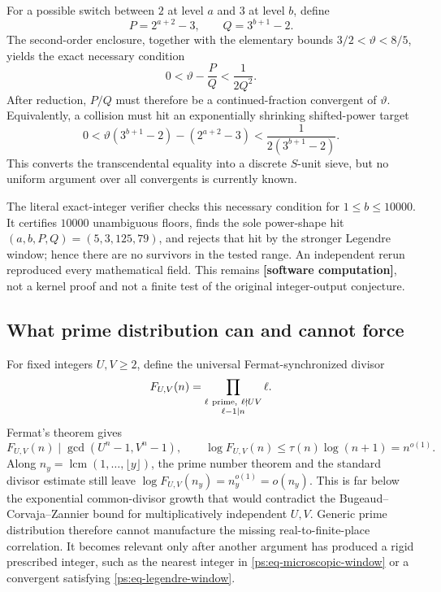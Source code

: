 \documentclass[11pt,oneside]{article}
\theoremstyle{definition}
\theoremstyle{remark}
\newcommand{\thetaq}{\vartheta}
\newcommand{\statuscomp}{\textcolor{computeviolet}{\textbf{[software computation]}}}
\begin{document}
For a possible switch between $2$ at level $a$ and $3$ at level $b$, define
\begin{equation}
 P=2^{a+2}-3,
 \qquad Q=3^{b+1}-2.
 \label{ps:eq-PQ}
\end{equation}
The second-order enclosure, together with the elementary bounds
$3/2<\thetaq<8/5$, yields the exact necessary condition
\begin{equation}
 0<\thetaq-\frac PQ<\frac1{2Q^2}.
 \label{ps:eq-legendre-window}
\end{equation}
After reduction, $P/Q$ must therefore be a continued-fraction convergent of $\thetaq$.
Equivalently, a collision must hit an exponentially shrinking shifted-power target
\[
 0<\thetaq(3^{b+1}-2)-(2^{a+2}-3)
 <\frac1{2(3^{b+1}-2)}.
\]
This converts the transcendental equality into a discrete $S$-unit sieve, but no uniform
argument over all convergents is currently known.

The literal exact-integer verifier checks this necessary condition for
$1\le b\le10000$.  It certifies $10000$ unambiguous floors, finds the sole power-shape hit
$(a,b,P,Q)=(5,3,125,79)$, and rejects that hit by the stronger Legendre window; hence there
are no survivors in the tested range.  An independent rerun reproduced every mathematical
field.
This remains \statuscomp{}, not a kernel proof and not a finite test of the original
integer-output conjecture.

\subsection{What prime distribution can and cannot force}
\label{ps:prime-barriers}

For fixed integers $U,V\ge2$, define the universal Fermat-synchronized divisor
\[
 F_{U,V}(n)=
 \prod_{\substack{\ell\ {\rm prime},\ \ell\nmid UV\\ \ell-1\mid n}}\ell.
\]
Fermat's theorem gives
\begin{equation}
 F_{U,V}(n)\mid\gcd(U^n-1,V^n-1),
 \qquad
 \log F_{U,V}(n)\le\tau(n)\log(n+1)=n^{o(1)}.
 \label{ps:eq-fermat-sync}
\end{equation}
Along $n_y=\operatorname{lcm}(1,\ldots,\lfloor y\rfloor)$, the prime number theorem and the
standard divisor estimate still leave $\log F_{U,V}(n_y)=n_y^{o(1)}=o(n_y)$.  This is far
below the exponential common-divisor growth that would contradict the
Bugeaud--Corvaja--Zannier bound for multiplicatively independent $U,V$.  Generic prime
distribution therefore cannot manufacture the missing real-to-finite-place correlation.
It becomes relevant only after another argument has produced a rigid prescribed integer,
such as the nearest integer in \eqref{ps:eq-microscopic-window} or a convergent satisfying
\eqref{ps:eq-legendre-window}.
\end{document}
